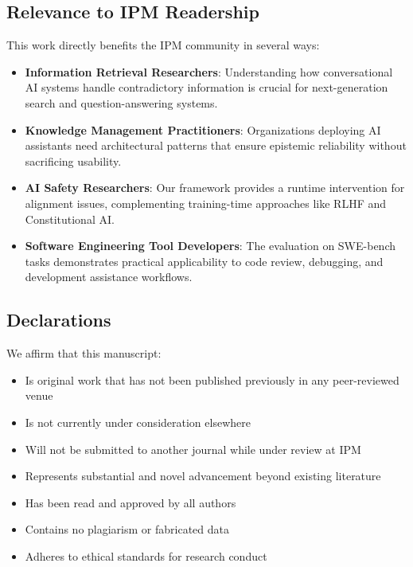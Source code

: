 \documentclass[a4paper]{article}
\begin{document}
\vspace{0.3cm}

\subsection*{Relevance to IPM Readership}

This work directly benefits the IPM community in several ways:

\begin{itemize}
    \item \textbf{Information Retrieval Researchers}: Understanding how conversational AI systems handle contradictory information is crucial for next-generation search and question-answering systems.

    \item \textbf{Knowledge Management Practitioners}: Organizations deploying AI assistants need architectural patterns that ensure epistemic reliability without sacrificing usability.

    \item \textbf{AI Safety Researchers}: Our framework provides a runtime intervention for alignment issues, complementing training-time approaches like RLHF and Constitutional AI.

    \item \textbf{Software Engineering Tool Developers}: The evaluation on SWE-bench tasks demonstrates practical applicability to code review, debugging, and development assistance workflows.
\end{itemize}

\vspace{0.3cm}

\subsection*{Declarations}

We affirm that this manuscript:
\begin{itemize}
    \item Is original work that has not been published previously in any peer-reviewed venue
    \item Is not currently under consideration elsewhere
    \item Will not be submitted to another journal while under review at IPM
    \item Represents substantial and novel advancement beyond existing literature
    \item Has been read and approved by all authors
    \item Contains no plagiarism or fabricated data
    \item Adheres to ethical standards for research conduct
\end{itemize}
\end{document}
